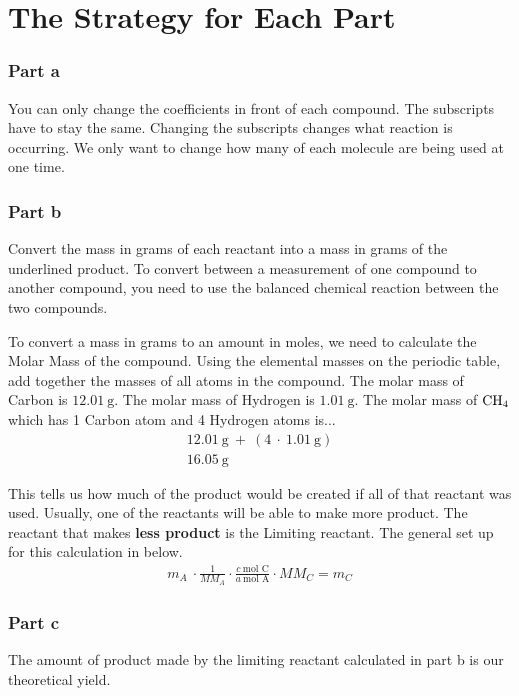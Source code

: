 \documentclass[12pt, oneside, letterpaper]{book}
\begin{document}
\section{The Strategy for Each Part}

\subsubsection{Part a}
You can only change the coefficients in front of each compound. The subscripts have to stay the same. Changing the subscripts changes what reaction is occurring. We only want to change how many of each molecule are being used at one time. 

\subsubsection{Part b} 
Convert the mass in grams of each reactant into a mass in grams of the underlined product. To convert between a measurement of one compound to another compound, you need to use the balanced chemical reaction between the two compounds.

To convert a mass in grams to an amount in moles, we need to calculate the Molar Mass of the compound. Using the elemental masses on the periodic table, add together the masses of all atoms in the compound. The molar mass of Carbon is $\qty{12.01}{\gram}$. The molar mass of Hydrogen is $\qty{1.01}{\gram}$. The molar mass of $\ce{CH4}$ which has 1 Carbon atom and 4 Hydrogen atoms is... 
\begin{gather*}
    \qty{12.01}{\gram} \ + \ (4 \ \cdot \ \qty{1.01 }{\gram}) \\ 
    \qty{16.05}{\gram}
\end{gather*}

This tells us how much of the product would be created if all of that reactant was used. Usually, one of the reactants will be able to make more product. The reactant that makes \textbf{less product} is the Limiting reactant. The general set up for this calculation in below. 
\begin{gather*} 
    m_A \ \cdot \frac{1}{MM_A} \cdot \frac{c \ \text{mol C}}{a \ \text{mol A}} \cdot MM_C = \boxed{m_C}
\end{gather*}

\subsubsection{Part c} 
The amount of product made by the limiting reactant calculated in part b is our theoretical yield. 
\end{document}
